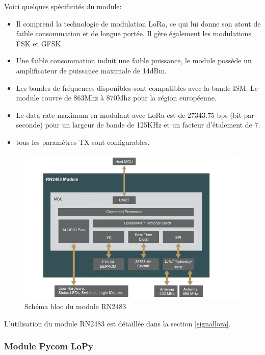 Voici quelques spécificités du module:
\vspace{0.1cm}

\begin{itemize}
\item Il comprend la technologie de modulation \ac{LoRa}, ce qui lui donne son atout de faible consommation et de longue portée. Il gère également les modulations \ac{FSK} et \ac{GFSK}.
\item Une faible consommation induit une faible puissance, le module possède un amplificateur de puissance maximale de 14dBm.
\item Les bandes de fréquences disponibles sont compatibles avec la bande \ac{ISM}. Le module couvre de 863Mhz à 870Mhz pour la région européenne.
\item Le data rate maximum en modulant avec LoRa est de 27343.75 bps (bit par seconde) pour un largeur de bande de 125KHz et un facteur d'étalement de 7.
\item tous les paramètres TX sont configurables.
\end{itemize}


\begin{figure}[h]
\centering

\includegraphics[scale=0.8]{images/SBrn2483.png}
\caption{Schéma bloc du module RN2483}\label{term3002}
\end{figure}

L'utilisation du module RN2483 est détaillée dans la section \ref{signallora}.

\subsubsection{Module Pycom LoPy}



